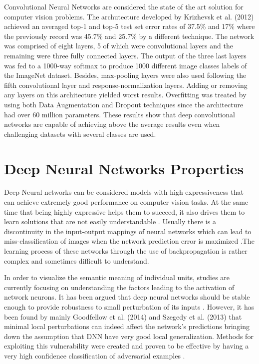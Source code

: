 Convolutional Neural Networks are considered the state of the art solution for computer vision problems. The archutecture developed by Krizhevsk et al. (2012) achieved an averaged top-1 and top-5 test set error rates of 37.5\% and 17\% where the previously record was 45.7\% and 25.7\% by a different technique. The network was comprised of eight layers, 5 of which were convolutional layers and the remaining were three fully connected layers. The output of the three last layers was fed to a 1000-way softmax to produce 1000 different image classes labels of the ImageNet dataset. Besides, max-pooling layers were also used following the fifth convolutional layer and response-normalization layers. Adding or removing any layers on this architecture yielded worst results. Overfitting was treated by using both Data Augmentation and Dropout \cite{hinton2012improving} techniques since the architecture had over 60 million parameters. These results show that deep convolutional networks are capable of achieving above the average results even when challenging datasets with several classes are used.

\section{Deep Neural Networks Properties}\label{subsec: nn_props}

Deep Neural networks can be considered models with high expressiveness that can achieve extremely good performance on computer vision tasks. At the same time that being highly expressive helps them to succeed, it also drives them to learn solutions that are not easily understandable \cite{szegedy2013}. Usually there is a discontinuity in the input-output mappings of neural networks which can lead to miss-classification of images when the network prediction error is maximized \cite{gu2014}.The learning process of these networks through the use of backpropagation is rather complex and sometimes difficult to understand.

In order to visualize the semantic meaning of individual units, studies are currently focusing on understanding the factors leading to the activation of network neurons. It has been argued that deep neural networks should be stable enough to provide robustness to small perturbation of its inputs \cite{szegedy2013}. However, it has been found by mainly Goodfellow et al. (2014) and Szegedy et al. (2013) that minimal local perturbations can indeed affect the network's predictions bringing down the assumption that DNN have very good local generalization. Methods for exploiting this vulnerability were created and proven to be effective by having a very high confidence classification of adversarial examples \cite{goodfellow2016}.

